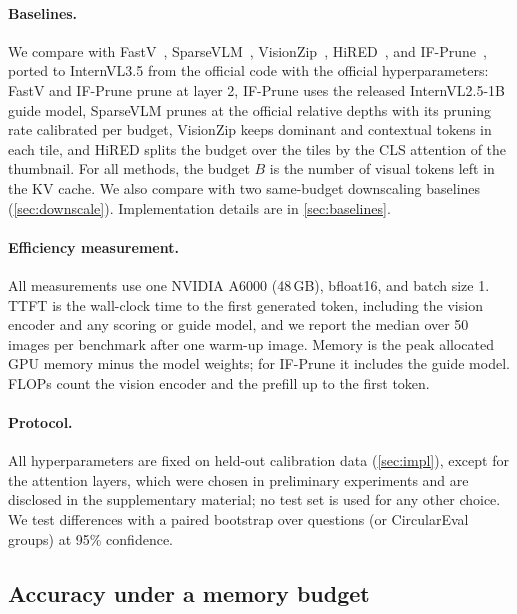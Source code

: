 \paragraph{Baselines.}
We compare with FastV~\cite{fastv}, SparseVLM~\cite{sparsevlm}, VisionZip~\cite{visionzip}, HiRED~\cite{hired}, and
IF-Prune~\cite{ifprune}, ported to InternVL3.5 from the official code with the official
hyperparameters: FastV and IF-Prune prune at layer 2, IF-Prune uses the released InternVL2.5-1B guide
model, SparseVLM prunes at the official relative depths with its pruning rate calibrated per budget,
VisionZip keeps dominant and contextual tokens in each tile, and HiRED splits the budget over the tiles by
the CLS attention of the thumbnail. For all methods, the budget $B$ is the
number of visual tokens left in the KV cache. We also compare with two same-budget downscaling baselines
(\cref{sec:downscale}). Implementation details are in \cref{sec:baselines}.

\paragraph{Efficiency measurement.}
All measurements use one NVIDIA A6000 (48\,GB), bfloat16, and batch size 1. TTFT is the wall-clock time
to the first generated token, including the vision encoder and any scoring or guide model, and we report the median over 50 images per benchmark after one warm-up image. Memory is the peak
allocated GPU memory minus the model weights; for IF-Prune it includes the guide model. FLOPs count the
vision encoder and the prefill up to the first token.

\paragraph{Protocol.}
All \method hyperparameters are fixed on held-out calibration data (\cref{sec:impl}), except for the attention layers, which were chosen in preliminary experiments and are disclosed in the supplementary material; no test set is used for any other choice. We test differences with a paired bootstrap over questions (or CircularEval groups) at
95\% confidence.

\subsection{Accuracy under a memory budget}
\label{sec:main}

